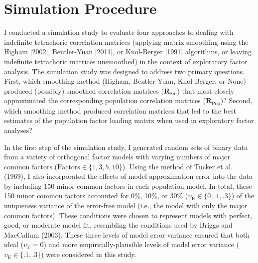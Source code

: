 \documentclass[
  english,
  man]{apa6}
\begin{document}
\hypertarget{simulation-procedure}{%
\section{Simulation Procedure}\label{simulation-procedure}}

I conducted a simulation study to evaluate four approaches to dealing with indefinite tetrachoric correlation matrices (applying matrix smoothing using the Higham {[}2002{]}, Bentler-Yuan {[}2011{]}, or Knol-Berger {[}1991{]} algorithms, or leaving indefinite tetrachoric matrices unsmoothed) in the context of exploratory factor analysis. The simulation study was designed to address two primary questions. First, which smoothing method (Higham, Bentler-Yuan, Knol-Berger, or None) produced (possibly) smoothed correlation matrices (\(\mathbf{R}_{\textrm{Sm}}\)) that most closely approximated the corresponding population correlation matrices (\(\mathbf{R}_{\textrm{Pop}}\))? Second, which smoothing method produced correlation matrices that led to the best estimates of the population factor loading matrix when used in exploratory factor analyses?

In the first step of the simulation study, I generated random sets of binary data from a variety of orthogonal factor models with varying numbers of major common factors (\(\textrm{Factors} \in \{1, 3, 5, 10 \}\)). Using the method of Tucker et al. (1969), I also incorporated the effects of model approximation error into the data by including 150 minor common factors in each population model. In total, these 150 minor common factors accounted for 0\%, 10\%, or 30\% (\(\upsilon_{\textrm{E}} \in \{ 0, .1, .3 \}\)) of the uniqueness variance of the error-free model (i.e., the model with only the major common factors). These conditions were chosen to represent models with perfect, good, or moderate model fit, resembling the conditions used by Briggs and MacCallum (2003). These three levels of model error variance ensured that both ideal (\(\upsilon_{\textrm{E}} = 0\)) and more empirically-plausible levels of model error variance (\(\upsilon_{\textrm{E}} \in \{ .1, .3\}\)) were considered in this study.
\end{document}
